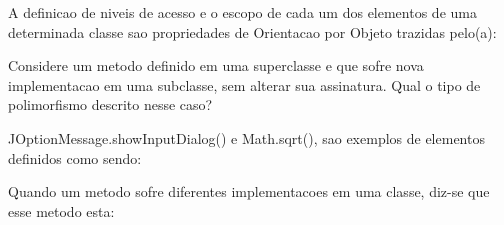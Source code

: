
\begin{multiplechoice}[rearrange={yes}, examcolumns=2]
  \begin{question}
     A definicao de niveis de acesso e o escopo de cada um dos elementos de uma determinada classe sao propriedades de Orientacao por Objeto trazidas pelo(a):
  \end{question}

  \begin{question}
     Considere um metodo definido em uma superclasse e que sofre nova implementacao em uma subclasse, sem alterar sua assinatura. Qual o tipo de polimorfismo descrito nesse caso? 
  \end{question}

  \begin{question}
     JOptionMessage.showInputDialog() e Math.sqrt(), sao exemplos de elementos definidos como sendo:
  \end{question}

  \begin{question}
     Quando um metodo sofre diferentes implementacoes em uma classe, diz-se que esse metodo esta: 
  \end{question}
\end{multiplechoice}
